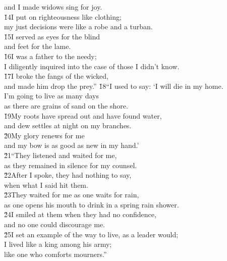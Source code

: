 \begin{poetry}
\poemll    and I made widows sing for joy. \\
\poeml \v{14}I put on righteousness like clothing; \\
\poemll    my just decisions were like a robe and a turban. \\
\poeml \v{15}I served as eyes for the blind \\
\poemll    and feet for the lame. \\
\poeml \v{16}I was a father to the needy; \\
\poemll    I diligently inquired into the case of those I didn't know. \\
\poeml \v{17}I broke the fangs of the wicked, \\
\poemll    and made him drop the prey.''
\poeml \v{18}``I used to say: `I will die in my home. \\
\poemll    I'm going to live as many days \\
\poemlll       as there are grains of sand on the shore. \\
\poeml \v{19}My roots have spread out and have found water, \\
\poemll    and dew settles at night on my branches. \\
\poeml \v{20}My glory renews for me \\
\poemll    and my bow is as good as new in my hand.' \\
\poeml \v{21}``They listened and waited for me, \\
\poemll    as they remained in silence for my counsel. \\
\poeml \v{22}After I spoke, they had nothing to say, \\
\poemll    when what I said hit them. \\
\poeml \v{23}They waited for me as one waits for rain, \\
\poemll    as one opens his mouth to drink in a spring rain shower. \\
\poeml \v{24}I smiled at them when they had no confidence, \\
\poemll    and no one could discourage me. \\
\poeml \v{25}I set an example of the way to live, as a leader would; \\
\poemll    I lived like a king among his army; \\
\poemlll       like one who comforts mourners.''
\end{poetry}

